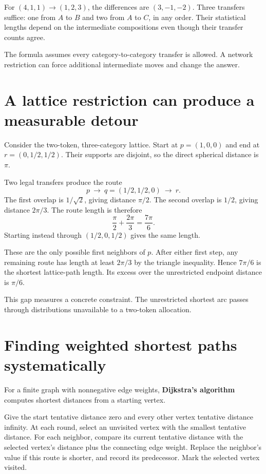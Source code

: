 \documentclass[11pt,oneside,openany]{book}
\theoremstyle{definition}
\theoremstyle{remark}
\numberwithin{equation}{chapter}
\begin{document}
For \((4,1,1)\to(1,2,3)\), the differences are \((3,-1,-2)\). Three transfers suffice: one from \(A\) to \(B\) and two from \(A\) to \(C\), in any order. Their statistical lengths depend on the intermediate compositions even though their transfer counts agree.

The formula assumes every category-to-category transfer is allowed. A network restriction can force additional intermediate moves and change the answer.

\section{A lattice restriction can produce a measurable detour}\label{ch08-a-lattice-restriction-can-produce-a-measurable-detour}

Consider the two-token, three-category lattice. Start at \(p=(1,0,0)\) and end at \(r=(0,1/2,1/2)\). Their supports are disjoint, so the direct spherical distance is \(\pi\).

Two legal transfers produce the route \[p\ \longrightarrow\ q=(1/2,1/2,0)\ \longrightarrow\ r.\] The first overlap is \(1/\sqrt2\), giving distance \(\pi/2\). The second overlap is \(1/2\), giving distance \(2\pi/3\). The route length is therefore \[\frac\pi2+\frac{2\pi}3=\frac{7\pi}6.\] Starting instead through \((1/2,0,1/2)\) gives the same length.

These are the only possible first neighbors of \(p\). After either first step, any remaining route has length at least \(2\pi/3\) by the triangle inequality. Hence \(7\pi/6\) is the shortest lattice-path length. Its excess over the unrestricted endpoint distance is \(\pi/6\).

This gap measures a concrete constraint. The unrestricted shortest arc passes through distributions unavailable to a two-token allocation.

\section{Finding weighted shortest paths systematically}\label{ch08-finding-weighted-shortest-paths-systematically}

For a finite graph with nonnegative edge weights, \textbf{Dijkstra's algorithm} computes shortest distances from a starting vertex.

Give the start tentative distance zero and every other vertex tentative distance infinity. At each round, select an unvisited vertex with the smallest tentative distance. For each neighbor, compare its current tentative distance with the selected vertex's distance plus the connecting edge weight. Replace the neighbor's value if this route is shorter, and record its predecessor. Mark the selected vertex visited.
\end{document}
